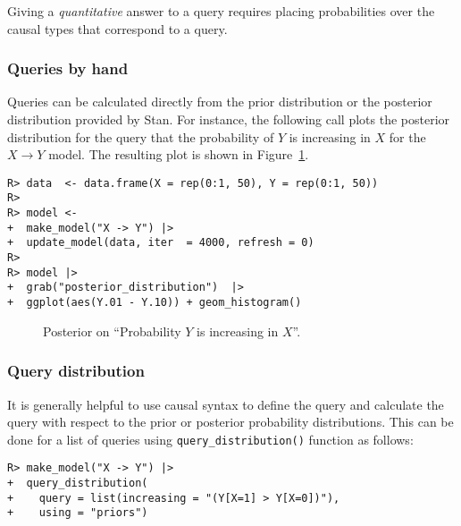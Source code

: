 \documentclass[
  11pt,
  article]{jss}
\begin{document}
Giving a \emph{quantitative} answer to a query requires placing
probabilities over the causal types that correspond to a query.

\subsubsection{Queries by hand}\label{queries-by-hand}

Queries can be calculated directly from the prior distribution or the
posterior distribution provided by Stan. For instance, the following
call plots the posterior distribution for the query that the probability
of \(Y\) is increasing in \(X\) for the \(X \rightarrow Y\) model. The
resulting plot is shown in Figure~\ref{fig-posterior-dist}.

\begin{verbatim}
R> data  <- data.frame(X = rep(0:1, 50), Y = rep(0:1, 50))
R> 
R> model <- 
+  make_model("X -> Y") |>
+  update_model(data, iter  = 4000, refresh = 0)
R> 
R> model |> 
+  grab("posterior_distribution")  |> 
+  ggplot(aes(Y.01 - Y.10)) + geom_histogram() 
\end{verbatim}

\begin{figure}[t]


\caption{\label{fig-posterior-dist}Posterior on ``Probability \(Y\) is
increasing in \(X\)''.}

\end{figure}%

\FloatBarrier

\subsubsection{Query distribution}\label{query-distribution}

It is generally helpful to use causal syntax to define the query and
calculate the query with respect to the prior or posterior probability
distributions. This can be done for a list of queries using
\texttt{query\_distribution()} function as follows:

\begin{verbatim}
R> make_model("X -> Y") |> 
+  query_distribution(
+    query = list(increasing = "(Y[X=1] > Y[X=0])"), 
+    using = "priors")
\end{verbatim}
\end{document}
